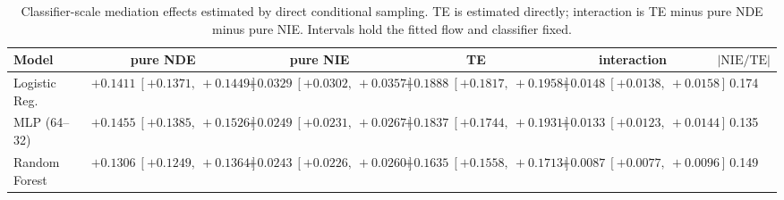 \begin{table}[htbp]
  \centering
  \caption{Classifier-scale mediation effects estimated by direct conditional sampling. TE is estimated directly; interaction is TE minus pure NDE minus pure NIE. Intervals hold the fitted flow and classifier fixed.}
  \label{tab:adult_gap_overall}
  \begin{tabular}{lccccc}
    \toprule
    Model & pure NDE & pure NIE & TE & interaction & $|\mathrm{NIE}/\mathrm{TE}|$ \\
    \midrule
    Logistic Reg. & $+0.1411\ [+0.1371,\ +0.1449]$ & $+0.0329\ [+0.0302,\ +0.0357]$ & $+0.1888\ [+0.1817,\ +0.1958]$ & $+0.0148\ [+0.0138,\ +0.0158]$ & 0.174 \\
    MLP (64--32) & $+0.1455\ [+0.1385,\ +0.1526]$ & $+0.0249\ [+0.0231,\ +0.0267]$ & $+0.1837\ [+0.1744,\ +0.1931]$ & $+0.0133\ [+0.0123,\ +0.0144]$ & 0.135 \\
    Random Forest & $+0.1306\ [+0.1249,\ +0.1364]$ & $+0.0243\ [+0.0226,\ +0.0260]$ & $+0.1635\ [+0.1558,\ +0.1713]$ & $+0.0087\ [+0.0077,\ +0.0096]$ & 0.149 \\
    \bottomrule
  \end{tabular}
\end{table}